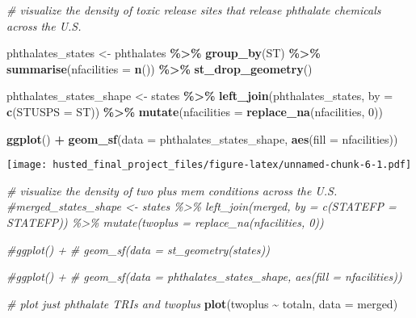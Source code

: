 \documentclass[
]{article}
\newenvironment{Shaded}{\begin{snugshade}}{\end{snugshade}}
\newcommand{\AttributeTok}[1]{\textcolor[rgb]{0.13,0.29,0.53}{#1}}
\newcommand{\CommentTok}[1]{\textcolor[rgb]{0.56,0.35,0.01}{\textit{#1}}}
\newcommand{\DecValTok}[1]{\textcolor[rgb]{0.00,0.00,0.81}{#1}}
\newcommand{\FunctionTok}[1]{\textcolor[rgb]{0.13,0.29,0.53}{\textbf{#1}}}
\newcommand{\NormalTok}[1]{#1}
\newcommand{\OtherTok}[1]{\textcolor[rgb]{0.56,0.35,0.01}{#1}}
\newcommand{\SpecialCharTok}[1]{\textcolor[rgb]{0.81,0.36,0.00}{\textbf{#1}}}
\newcommand{\StringTok}[1]{\textcolor[rgb]{0.31,0.60,0.02}{#1}}
\begin{document}
\begin{Shaded}
\begin{Highlighting}[]
\CommentTok{\# visualize the density of toxic release sites that release phthalate chemicals across the U.S.}

\NormalTok{phthalates\_states }\OtherTok{\textless{}{-}}\NormalTok{ phthalates }\SpecialCharTok{\%\textgreater{}\%} \FunctionTok{group\_by}\NormalTok{(ST) }\SpecialCharTok{\%\textgreater{}\%} \FunctionTok{summarise}\NormalTok{(}\AttributeTok{nfacilities =} \FunctionTok{n}\NormalTok{()) }\SpecialCharTok{\%\textgreater{}\%} \FunctionTok{st\_drop\_geometry}\NormalTok{()}

\NormalTok{phthalates\_states\_shape }\OtherTok{\textless{}{-}}\NormalTok{ states }\SpecialCharTok{\%\textgreater{}\%} \FunctionTok{left\_join}\NormalTok{(phthalates\_states, }\AttributeTok{by =} \FunctionTok{c}\NormalTok{(}\StringTok{\textquotesingle{}STUSPS\textquotesingle{}} \OtherTok{=} \StringTok{\textquotesingle{}ST\textquotesingle{}}\NormalTok{)) }\SpecialCharTok{\%\textgreater{}\%} \FunctionTok{mutate}\NormalTok{(}\AttributeTok{nfacilities =} \FunctionTok{replace\_na}\NormalTok{(nfacilities, }\DecValTok{0}\NormalTok{))}

\FunctionTok{ggplot}\NormalTok{() }\SpecialCharTok{+}
  \FunctionTok{geom\_sf}\NormalTok{(}\AttributeTok{data =}\NormalTok{ phthalates\_states\_shape, }\FunctionTok{aes}\NormalTok{(}\AttributeTok{fill =}\NormalTok{ nfacilities))}
\end{Highlighting}
\end{Shaded}

\texttt{[image: husted\_final\_project\_files/figure-latex/unnamed-chunk-6-1.pdf]}

\begin{Shaded}
\begin{Highlighting}[]
\CommentTok{\# visualize the density of two plus mem conditions across the U.S.}
\CommentTok{\#merged\_states\_shape \textless{}{-} states \%\textgreater{}\% left\_join(merged, by = c(\textquotesingle{}STATEFP\textquotesingle{} = \textquotesingle{}STATEFP\textquotesingle{})) \%\textgreater{}\% mutate(twoplus = replace\_na(nfacilities, 0))}

\CommentTok{\#ggplot() +}
 \CommentTok{\# geom\_sf(data = st\_geometry(states))}

\CommentTok{\#ggplot() +}
 \CommentTok{\# geom\_sf(data = phthalates\_states\_shape, aes(fill = nfacilities))}



\CommentTok{\# plot just phthalate TRIs and twoplus}
\FunctionTok{plot}\NormalTok{(twoplus }\SpecialCharTok{\textasciitilde{}}\NormalTok{ totaln, }\AttributeTok{data =}\NormalTok{ merged)}
\end{Highlighting}
\end{Shaded}
\end{document}
